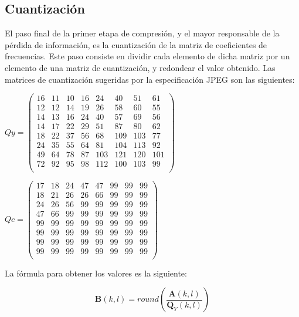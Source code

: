 \documentclass[%
	final,
	reprint,
	notitlepage,
	narroweqnarray,
	inline,
	twoside,
	invited
	]{ieee}
\begin{document}
\subsection{Cuantización}

\par El paso final de la primer etapa de compresión, y el mayor responsable de la pérdida de información, es la cuantización 
de la matriz de coeficientes de frecuencias. Este paso consiste en dividir cada elemento de dicha matriz por un elemento de una  
matriz de cuantización, y redondear el valor obtenido. 
Las matrices de cuantización sugeridas por la especificación JPEG son las siguientes:

\( Qy = 
\begin{pmatrix}
16 & 11 & 10 & 16 & 24 & 40 & 51 & 61 \\
12 & 12 & 14 & 19 & 26 & 58 & 60 & 55 \\
14 & 13 & 16 & 24 & 40 & 57 & 69 & 56 \\ 
14 & 17 & 22 & 29 & 51 & 87 & 80 & 62 \\ 
18 & 22 & 37 & 56 & 68 & 109 & 103 & 77 \\
24 & 35 & 55 & 64 & 81 & 104 & 113 & 92  \\ 
49 & 64 & 78 & 87 & 103 & 121 & 120 & 101 \\
72 & 92 & 95 & 98 & 112 & 100 & 103 & 99 \\ 
\end{pmatrix}\)
\par
\( Qc = 
\begin{pmatrix}

17 & 18 & 24 & 47 & 47 & 99 & 99 & 99 \\
18 & 21 & 26 & 26 & 66 & 99 & 99 & 99 \\
24 & 26 & 56 & 99 & 99 & 99 & 99 & 99 \\ 
47 & 66 & 99 & 99 & 99 & 99 & 99 & 99 \\ 
99 & 99 & 99 & 99 & 99 & 99 & 99 & 99 \\
99 & 99 & 99 & 99 & 99 & 99 & 99 & 99 \\
99 & 99 & 99 & 99 & 99 & 99 & 99 & 99 \\
99 & 99 & 99 & 99 & 99 & 99 & 99 & 99 \\
\end{pmatrix}\)

La fórmula para obtener los valores es la siguiente:

\begin{equation}
\label{eqCuantizacion}
\mathbf{B}(k,l)=round\left(\frac{\mathbf{A}(k,l)}{\mathbf{Q}_Y(k,l)}\right)
\end{equation}
\end{document}
